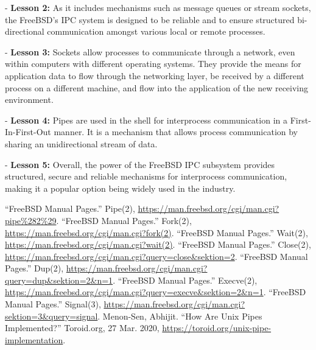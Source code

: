 \documentclass[12pt, dvipsnames, a4paper]{article}
\begin{document}
- \textbf{Lesson 2:} As it includes mechanisms such as message queues or stream sockets, the FreeBSD’s IPC system is designed to be reliable and to ensure structured bi-directional communication amongst various local or remote processes.

- \textbf{Lesson 3:} Sockets allow processes to communicate through a network, even within computers with different operating systems. They provide the means for application data to flow through the networking layer, be received by a different process on a different machine, and flow into the application of the new receiving environment. 

- \textbf{Lesson 4:} Pipes are used in the shell for interprocess communication in a First-In-First-Out manner. It is a mechanism that allows process communication by sharing an unidirectional stream of data. 

- \textbf{Lesson 5:} Overall, the power of the FreeBSD IPC subsystem provides structured, secure and reliable mechanisms for interprocess communication, making it a popular option being widely used in the industry.


\begin{thebibliography}{00}
	 “FreeBSD Manual Pages.” Pipe(2), \href{https://man.freebsd.org/cgi/man.cgi?pipe\%282\%29}{https://man.freebsd.org/cgi/man.cgi?pipe\%282\%29}.
	 “FreeBSD Manual Pages.” Fork(2), \href{https://man.freebsd.org/cgi/man.cgi?fork(2)}{https://man.freebsd.org/cgi/man.cgi?fork(2)}.
	 “FreeBSD Manual Pages.” Wait(2), \href{https://man.freebsd.org/cgi/man.cgi?wait(2)}{https://man.freebsd.org/cgi/man.cgi?wait(2)}.
	 “FreeBSD Manual Pages.” Close(2), \href{https://man.freebsd.org/cgi/man.cgi?query=close\&sektion=2}{https://man.freebsd.org/cgi/man.cgi?query=close\&sektion=2}.
	 “FreeBSD Manual Pages.” Dup(2), \href{https://man.freebsd.org/cgi/man.cgi?query=dup\&sektion=2\&n=1}{https://man.freebsd.org/cgi/man.cgi?query=dup\&sektion=2\&n=1}.
	 “FreeBSD Manual Pages.” Execve(2), \href{https://man.freebsd.org/cgi/man.cgi?query=execve\&sektion=2\&n=1}{https://man.freebsd.org/cgi/man.cgi?query=execve\&sektion=2\&n=1}.
	 “FreeBSD Manual Pages.” Signal(3), \href{https://man.freebsd.org/cgi/man.cgi?sektion=3\&query=signal}{https://man.freebsd.org/cgi/man.cgi?sektion=3\&query=signal}.
	 Menon-Sen, Abhijit. “How Are Unix Pipes Implemented?” Toroid.org, 27 Mar. 2020, \href{https://toroid.org/unix-pipe-implementation}{https://toroid.org/unix-pipe-implementation}.
\end{thebibliography}
\end{document}
